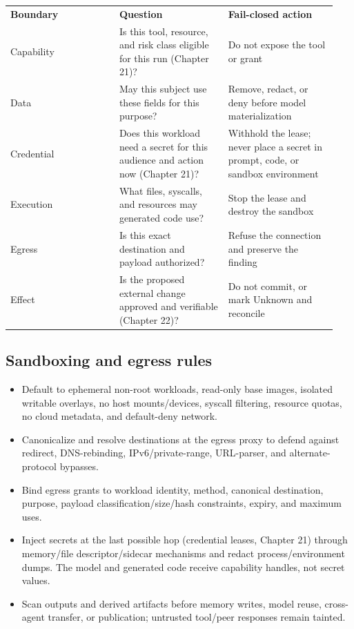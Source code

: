\BookTableStart
\small
\begin{tabular}{@{}Y{0.3133\linewidth}Y{0.3133\linewidth}Y{0.3133\linewidth}@{}}
\color{white}\bfseries \textbf{Boundary} & \color{white}\bfseries \textbf{Question} & \color{white}\bfseries \textbf{Fail-closed action} \\
Capability & Is this tool, resource, and risk class eligible for this run (Chapter 21)? & Do not expose the tool or grant \\
Data & May this subject use these fields for this purpose? & Remove, redact, or deny before model materialization \\
Credential & Does this workload need a secret for this audience and action now (Chapter 21)? & Withhold the lease; never place a secret in prompt, code, or sandbox environment \\
Execution & What files, syscalls, and resources may generated code use? & Stop the lease and destroy the sandbox \\
Egress & Is this exact destination and payload authorized? & Refuse the connection and preserve the finding \\
Effect & Is the proposed external change approved and verifiable (Chapter 22)? & Do not commit, or mark Unknown and reconcile \\
\end{tabular}
\BookTableEnd

\subsection{Sandboxing and egress rules}

\begin{itemize}

\item Default to ephemeral non-root workloads, read-only base images, isolated writable overlays, no host mounts/devices, syscall filtering, resource quotas, no cloud metadata, and default-deny network.

\item Canonicalize and resolve destinations at the egress proxy to defend against redirect, DNS-rebinding, IPv6/private-range, URL-parser, and alternate-protocol bypasses.

\item Bind egress grants to workload identity, method, canonical destination, purpose, payload classification/size/hash constraints, expiry, and maximum uses.

\item Inject secrets at the last possible hop (credential leases, Chapter 21) through memory/file descriptor/sidecar mechanisms and redact process/environment dumps. The model and generated code receive capability handles, not secret values.

\item Scan outputs and derived artifacts before memory writes, model reuse, cross-agent transfer, or publication; untrusted tool/peer responses remain tainted.

\end{itemize}

